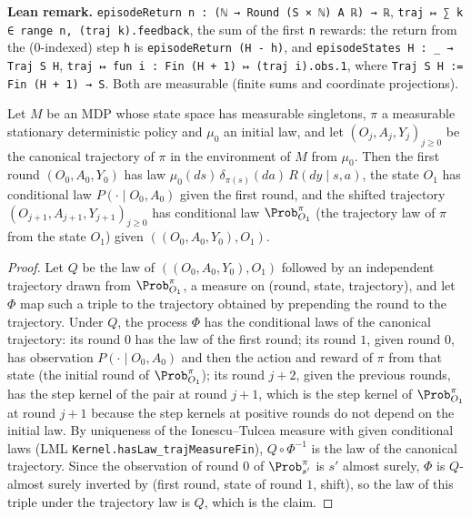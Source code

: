 \textbf{Lean remark.} \texttt{episodeReturn n : (ℕ → Round (S × ℕ) A ℝ) → ℝ},
\texttt{traj ↦ ∑ k ∈ range n, (traj k).feedback}, the sum of the first \texttt{n} rewards: the
return from the ($0$-indexed) step \texttt{h} is \texttt{episodeReturn (H - h)}, and
\texttt{episodeStates H : \_ → Traj S H}, \texttt{traj ↦ fun i : Fin (H + 1) ↦ (traj i).obs.1},
where \texttt{Traj S H := Fin (H + 1) → S}. Both are measurable (finite sums and coordinate
projections).

\begin{lemma}\label{lem:policy_markov}
\leanok
{}
Let $M$ be an MDP whose state space has measurable singletons, $\pi$ a measurable
stationary deterministic policy and $\mu_0$ an initial law, and let $(O_j, A_j, Y_j)_{j \ge 0}$ be
the canonical trajectory of $\pi$ in the environment of $M$ from $\mu_0$. Then the first round
$(O_0, A_0, Y_0)$ has law $\mu_0(ds)\,\delta_{\pi(s)}(da)\,R(dy \mid s, a)$, the state $O_1$ has
conditional law $P(\cdot \mid O_0, A_0)$ given the first round, and the shifted trajectory
$(O_{j+1}, A_{j+1}, Y_{j+1})_{j \ge 0}$ has conditional law $\Prob^\pi_{O_1}$ (the trajectory law of
$\pi$ from the state $O_1$) given $((O_0, A_0, Y_0), O_1)$.
\end{lemma}

\begin{proof}
\leanok
Let $Q$ be the law of $((O_0, A_0, Y_0), O_1)$ followed by an independent trajectory drawn from
$\Prob^\pi_{O_1}$, a measure on (round, state, trajectory), and let $\Phi$ map such a triple to the
trajectory obtained by prepending the round to the trajectory. Under $Q$, the process
$\Phi$ has the conditional laws of the canonical trajectory: its round $0$ has the law of the
first round; its round $1$, given round $0$, has observation $P(\cdot \mid O_0, A_0)$ and then the
action and reward of $\pi$ from that state (the initial round of $\Prob^\pi_{O_1}$); its round
$j + 2$, given the previous rounds, has the step kernel of the pair at round $j + 1$, which is the
step kernel of $\Prob^\pi_{O_1}$ at round $j + 1$ because the step kernels at positive rounds do
not depend on the initial law. By uniqueness of the Ionescu--Tulcea measure with given
conditional laws (LML \texttt{Kernel.hasLaw\_trajMeasureFin}), $Q \circ \Phi^{-1}$ is the law of
the canonical trajectory. Since the observation of round $0$ of $\Prob^\pi_{s'}$ is $s'$ almost
surely, $\Phi$ is $Q$-almost surely inverted by (first round, state of round $1$, shift), so the
law of this triple under the trajectory law is $Q$, which is the claim.
\end{proof}

